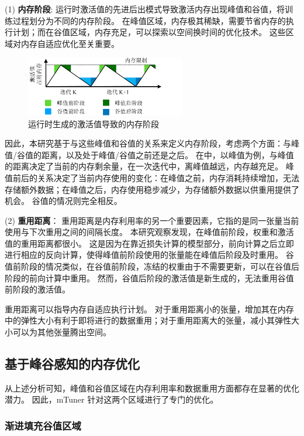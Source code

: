 (1) {\textbf{内存阶段}}:
运行时激活值的先进后出模式导致激活内存出现峰值和谷值，将训练过程划分为不同的内存阶段。
在峰值区域，内存极其稀缺，需要节省内存的执行计划；而在谷值区域，内存充足，可以探索以空间换时间的优化技术。
这些区域对内存自适应优化至关重要。

\begin{figure}[ht]
\centerline{\includegraphics[width=0.62\textwidth]{figures/mtuner/memory-stage-crop.pdf}}
\caption{运行时生成的激活值导致的内存阶段}
\label{fig:memory-stage}
\end{figure}

因此，本研究基于与这些峰值和谷值的关系来定义内存阶段，考虑两个方面：与峰值/谷值的距离，以及处于峰值/谷值之前还是之后。
在中，以峰值为例，与峰值的距离决定了当前的内存剩余量，在一次迭代中，离峰值越远，内存越充足。
峰值前后的关系决定了当前内存使用的变化：在峰值之前，内存消耗持续增加，无法存储额外数据；在峰值之后，内存使用稳步减少，为存储额外数据以供重用提供了机会。
谷值的情况则完全相反。

(2) {\textbf{重用距离}}：
重用距离是内存利用率的另一个重要因素，它指的是同一张量当前使用与下次重用之间的间隔长度。
本研究观察发现，在峰值前阶段，权重和激活值的重用距离都很小。
这是因为在靠近损失计算的模型部分，前向计算之后立即进行相应的反向计算，使得峰值前阶段使用的张量能在峰值后阶段及时重用。
谷值前阶段的情况类似，在谷值前阶段，冻结的权重由于不需要更新，可以在谷值后阶段的前向计算中重用。
然而，谷值后阶段的激活值是新生成的，无法重用谷值前阶段的激活值。

重用距离可以指导内存自适应执行计划。
对于重用距离小的张量，增加其在内存中的弹性大小有利于即将进行的数据重用；对于重用距离大的张量，减小其弹性大小可以为其他张量腾出空间。

\subsection{基于峰谷感知的内存优化}

从上述分析可知，峰值和谷值区域在内存利用率和数据重用方面都存在显著的优化潜力。
因此，mTuner 针对这两个区域进行了专门的优化。

\subsubsection{渐进填充谷值区域}

